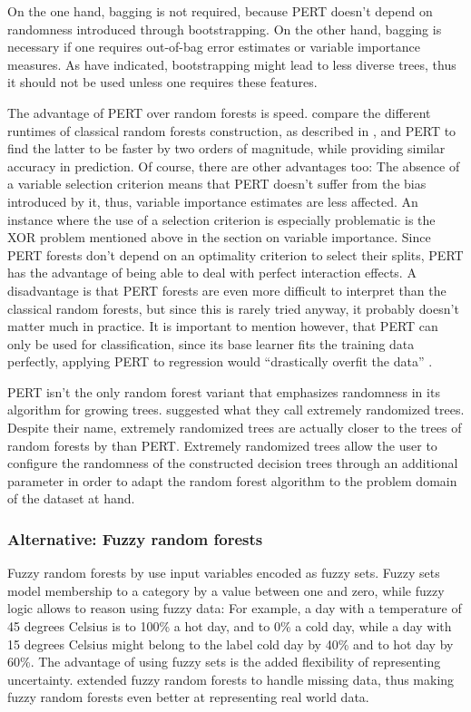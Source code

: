 \documentclass[a4paper,man,12pt,apacite,floatsintext,draftfirst]{apa6} %
\begin{document}
On the one hand, bagging is not required, because PERT doesn't depend on
randomness introduced through bootstrapping.
On the other hand, bagging is necessary if one requires out-of-bag
error estimates or variable importance measures.
As \cite{liu2005maximizing} have indicated, bootstrapping might lead
to less diverse trees, thus it should not be used unless one requires
these features.

The advantage of PERT over random forests is speed.
\cite{cutler2001pert} compare the different runtimes of classical random
forests construction, as described in \cite{breiman2001random}, and PERT
to find the latter to be faster by two orders of magnitude,
while providing similar accuracy in prediction.
Of course, there are other advantages too:
The absence of a variable selection criterion means that PERT doesn't suffer
from the bias introduced by it, thus, variable importance estimates are less
affected.
An instance where the use of a selection criterion is especially problematic
is the XOR problem mentioned above in the section on variable importance.
Since PERT forests don't depend on an optimality criterion to select their
splits, PERT has the advantage of being able to deal with perfect
interaction effects.
A disadvantage is that PERT forests are even more difficult to interpret than
the classical random forests, but since this is rarely tried anyway,
it probably doesn't matter much in practice.
It is important to mention however, that PERT can only be used for
classification,
since its base learner fits the training data perfectly, applying PERT to
regression would “drastically overfit the data” \cite{cutler2001pert}.

PERT isn't the only random forest variant that emphasizes randomness in its
algorithm for growing trees.
\cite{geurts2006extremely} suggested what they call extremely randomized trees.
Despite their name, extremely randomized trees are actually closer to the
trees of random forests by \cite{breiman2001random} than PERT.
Extremely randomized trees allow the user to configure the randomness of the
constructed decision trees through an additional parameter in order to adapt
the random forest algorithm to the problem domain of the dataset at hand.

\subsubsection{Alternative: Fuzzy random forests}
Fuzzy random forests by \cite{bonissone2008fuzzy} use input variables
encoded as fuzzy sets.
Fuzzy sets \cite{wpFS} model membership to a category by a value between
one and zero, while fuzzy logic \cite{wpFL} allows to reason using fuzzy data:
For example, a day with a temperature of 45 degrees Celsius is to 100\% a
hot day, and to 0\% a cold day, while a day with 15 degrees Celsius might
belong to the label cold day by 40\% and to hot day by 60\%.
The advantage of using fuzzy sets is the added flexibility of representing
uncertainty.
\cite{cadenas2012extending} extended fuzzy random forests to handle
missing data, thus making fuzzy random forests even better at representing
real world data.
\end{document}
